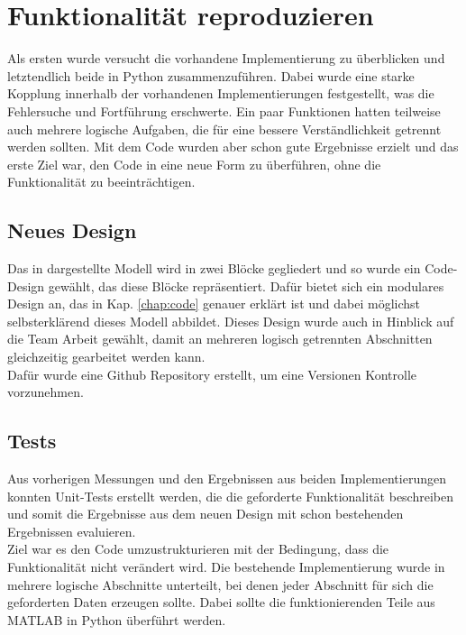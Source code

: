 \documentclass[../Report.tex]{subfiles}
\begin{document}
\section[Funktionalität reproduzieren]{Funktionalität reproduzieren}
\label{sec:vorg.reproduktion}
Als ersten wurde versucht die vorhandene Implementierung zu überblicken und letztendlich beide in Python zusammenzuführen. Dabei wurde eine starke Kopplung innerhalb der vorhandenen Implementierungen festgestellt, was die Fehlersuche und Fortführung erschwerte. Ein paar Funktionen hatten teilweise auch mehrere logische Aufgaben, die für eine bessere Verständlichkeit getrennt werden sollten. Mit dem Code wurden aber schon gute Ergebnisse erzielt und das erste Ziel war, den Code in eine neue Form zu überführen, ohne die Funktionalität zu beeinträchtigen.
\subsection{Neues Design}
\label{sec:vorg.design}
Das in  dargestellte Modell wird in zwei Blöcke gegliedert und so wurde ein Code-Design gewählt, das diese Blöcke repräsentiert. Dafür bietet sich ein modulares Design an, das in Kap. \ref{chap:code} genauer erklärt ist und dabei möglichst selbsterklärend dieses Modell abbildet. Dieses Design wurde auch in Hinblick auf die Team Arbeit gewählt, damit an mehreren logisch getrennten Abschnitten gleichzeitig gearbeitet werden kann. \\ Dafür wurde eine Github Repository erstellt, um eine Versionen Kontrolle vorzunehmen.
\subsection{Tests}
\label{sec:vorg.tests}
Aus vorherigen Messungen und den Ergebnissen aus beiden Implementierungen konnten Unit-Tests erstellt werden, die die geforderte Funktionalität beschreiben und somit die Ergebnisse aus dem neuen Design mit schon bestehenden Ergebnissen evaluieren. \\ Ziel war es den Code umzustrukturieren mit der Bedingung, dass die Funktionalität nicht verändert wird. Die bestehende Implementierung wurde in mehrere logische Abschnitte unterteilt, bei denen jeder Abschnitt für sich die geforderten Daten erzeugen sollte. Dabei sollte die funktionierenden Teile aus MATLAB in Python überführt werden.
\end{document}
